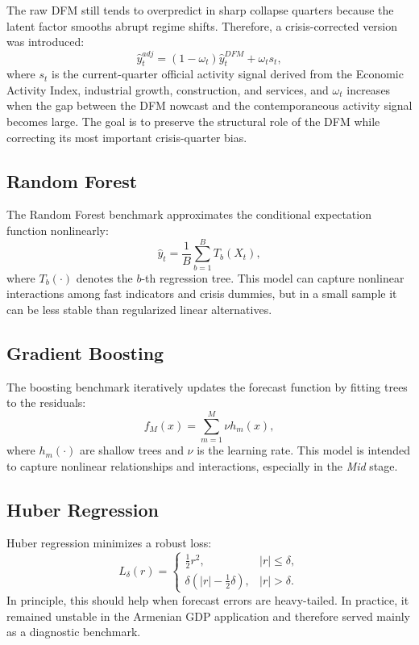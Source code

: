 \documentclass[12pt,a4paper]{article}
\begin{document}
The raw DFM still tends to overpredict in sharp collapse quarters because the latent factor smooths abrupt regime shifts. Therefore, a crisis-corrected version was introduced:
\begin{equation}
    \hat{y}^{adj}_t = (1-\omega_t)\hat{y}^{DFM}_t + \omega_t s_t,
\end{equation}
where $s_t$ is the current-quarter official activity signal derived from the Economic Activity Index, industrial growth, construction, and services, and $\omega_t$ increases when the gap between the DFM nowcast and the contemporaneous activity signal becomes large. The goal is to preserve the structural role of the DFM while correcting its most important crisis-quarter bias.

\subsection{Random Forest}

The Random Forest benchmark approximates the conditional expectation function nonlinearly:
\begin{equation}
    \hat{y}_t = \frac{1}{B}\sum_{b=1}^{B} T_b(X_t),
\end{equation}
where $T_b(\cdot)$ denotes the $b$-th regression tree. This model can capture nonlinear interactions among fast indicators and crisis dummies, but in a small sample it can be less stable than regularized linear alternatives.

\subsection{Gradient Boosting}

The boosting benchmark iteratively updates the forecast function by fitting trees to the residuals:
\begin{equation}
    f_M(x) = \sum_{m=1}^{M} \nu h_m(x),
\end{equation}
where $h_m(\cdot)$ are shallow trees and $\nu$ is the learning rate. This model is intended to capture nonlinear relationships and interactions, especially in the \textit{Mid} stage.

\subsection{Huber Regression}

Huber regression minimizes a robust loss:
\begin{equation}
    L_\delta(r) =
    \begin{cases}
        \frac{1}{2}r^2, & |r| \leq \delta, \\
        \delta \left(|r| - \frac{1}{2}\delta \right), & |r| > \delta.
    \end{cases}
\end{equation}
In principle, this should help when forecast errors are heavy-tailed. In practice, it remained unstable in the Armenian GDP application and therefore served mainly as a diagnostic benchmark.
\end{document}
